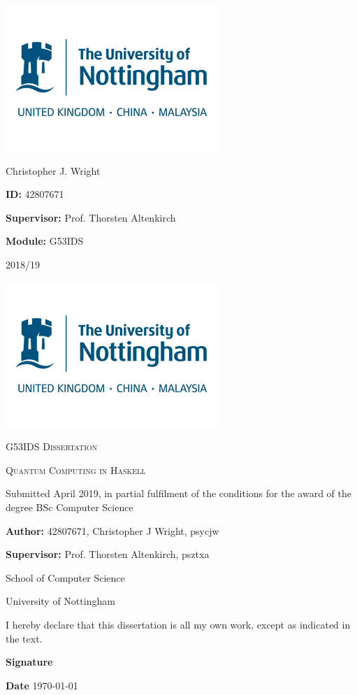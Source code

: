 \documentclass[a4paper,11pt, titlepage, twoside]{article}
\begin{document}
\begin{titlepage}
	\centering
	\includegraphics{uonlogo}\par
	\vfill
	{\huge Christopher J. Wright \par}
	\vfill
	{\huge \textbf{ID:} 42807671\par}
	{\huge \textbf{Supervisor:} Prof. Thorsten Altenkirch\par}
	{\huge \textbf{Module:} G53IDS\par}
	\vfill
	{\huge 2018/19}
\end{titlepage}
\shipout\null
\thispagestyle{empty}
\begin{titlepage}
	\centering
	\includegraphics{uonlogo}	
	\vfill
	{\scshape\large G53IDS Dissertation \par}
	{\scshape\LARGE Quantum Computing in Haskell \par}
	\vfill
	{\large Submitted April 2019, in partial fulfilment of the conditions for the award of the degree BSc Computer Science \par}
	\vfill
	{\large \textbf{Author:} 42807671, Christopher J Wright, psycjw \par}
	{\large \textbf{Supervisor:} Prof. Thorsten Altenkirch, psztxa \par}
	\vfill
	{\large School of Computer Science \par University of Nottingham}
	\vfill
	{I hereby declare that this dissertation is all my own work, except as indicated in the text.\par}
	\vfill
	\begin{flushleft}
		{\large \textbf{Signature} \par}
		\vfill
		{\large \textbf{Date} \hspace{2cm} \today\par}
	\end{flushleft}
\end{titlepage}
\shipout\null
\end{document}
